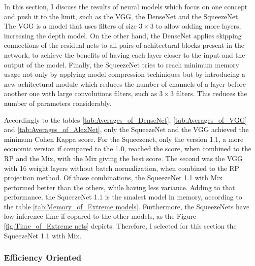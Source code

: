 In this section, I discuss the results of neural models which focus on one concept and push it to the limit, such as the VGG, the DenseNet and the SqueezeNet. The VGG is a model that uses filters of size $3\times 3$ to allow adding more layers, increasing the depth model. On the other hand, the DenseNet applies skipping connections of the residual nets to all pairs of achitectural blocks present in the network, to achieve the benefits of having each layer closer to the input and the output of the model. Finally, the SqueezeNet tries to reach minimum memory usage not only by applying model compression techiniques but by introducing a new achitectural module which reduces the number of channels of a layer before another one with large convolutions filters, such as $3 \times 3$ filters. This reduces the number of parameters considerably.

Accordingly to the tables \ref{tab:Averages_of_DenseNet}, \ref{tab:Averages_of_VGG} and \ref{tab:Averages_of_AlexNet}, only the SqueezeNet and the VGG achieved the minimum Cohen Kappa score. For the Squeezenet, only the version 1.1, a more economic version if compared to the 1.0, reached the score, when combined to the \gls{RP} and the \gls{Mix}, with the \gls{Mix} giving the best score. The second was the VGG with 16 weight layers without batch normalization, when combined to the \gls{RP} projection method. Of those combinations, the SqueezeNet 1.1 with \gls{Mix} performed better than the others, while having less variance. Adding to that performance, the SqueezeNet 1.1 is the smalest model in memory, according to the table \ref{tab:Memory_of_Extreme models}. Furthermore, the SqueezeNets have low inference time if copared to the other models, as the Figure \ref{fig:Time_of_Extreme nets} depicts. Therefore, I selected for this section the SqueezeNet 1.1 with \gls{Mix}.






\FloatBarrier

\subsubsection{Efficiency Oriented}

